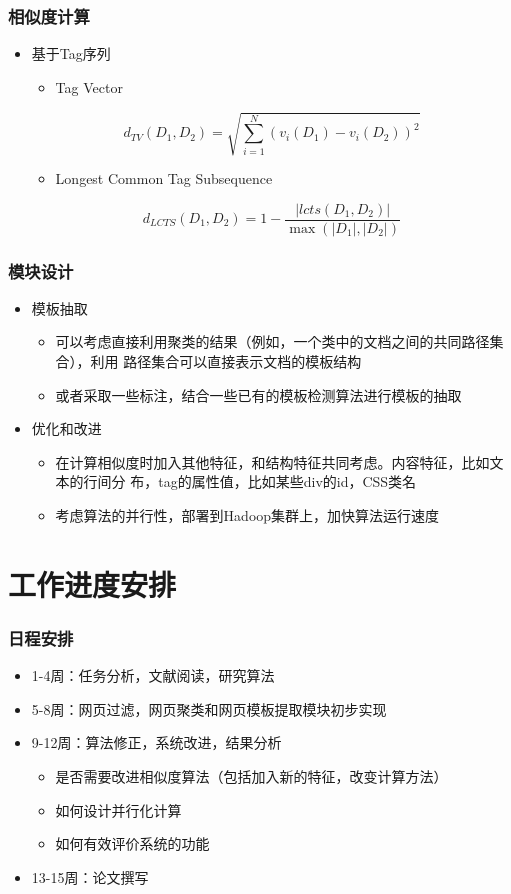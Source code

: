 \documentclass[11pt,presentation]{beamer}
\begin{document}
\begin{frame}
\frametitle{相似度计算}
\label{sec-2-8}
\begin{itemize}

\item 基于Tag序列
\label{sec-2-8-1}%
\begin{itemize}
\item Tag Vector
\end{itemize}
\[
d_{TV}(D_1,D_2)=\sqrt{\sum_{i=1}^N(v_i(D_1)-v_i(D_2))^2}
\]
\begin{itemize}
\item Longest Common Tag Subsequence
\end{itemize}
\[
d_{LCTS}(D_1,D_2)=1-\frac{|lcts(D_1,D_2)|}{\max(|D_1|,|D_2|)}
\]
\end{itemize} %
\end{frame}
\begin{frame}
\frametitle{模块设计}
\label{sec-2-9}
\begin{itemize}

\item 模板抽取
\label{sec-2-9-1}%
\begin{itemize}
\item 可以考虑直接利用聚类的结果（例如，一个类中的文档之间的共同路径集合），利用
      路径集合可以直接表示文档的模板结构
\item 或者采取一些标注，结合一些已有的模板检测算法进行模板的抽取
\end{itemize}

\item 优化和改进
\label{sec-2-9-2}%
\begin{itemize}
\item 在计算相似度时加入其他特征，和结构特征共同考虑。内容特征，比如文本的行间分
      布，tag的属性值，比如某些div的id，CSS类名
\item 考虑算法的并行性，部署到Hadoop集群上，加快算法运行速度
\end{itemize}
\end{itemize} %
\end{frame}
\section{工作进度安排}
\label{sec-3}
\begin{frame}
\frametitle{日程安排}
\label{sec-3-1}

\begin{itemize}
\item 1-4周：任务分析，文献阅读，研究算法
\item 5-8周：网页过滤，网页聚类和网页模板提取模块初步实现
\item 9-12周：算法修正，系统改进，结果分析
\begin{itemize}
\item 是否需要改进相似度算法（包括加入新的特征，改变计算方法）
\item 如何设计并行化计算
\item 如何有效评价系统的功能
\end{itemize}
\item 13-15周：论文撰写
\end{itemize}
\end{frame}
\end{document}
